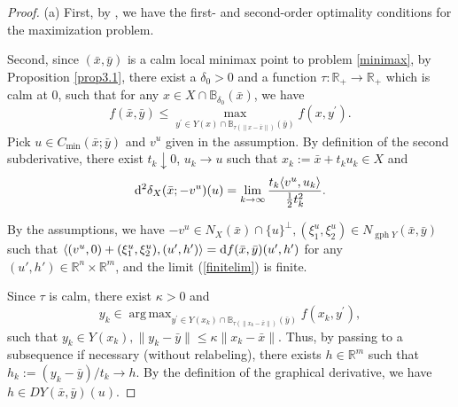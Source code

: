 \documentclass[11pt]{article}
\DeclareMathOperator*{\argmax}{arg\,max}
\numberwithin{equation}{section}
\begin{document}
{\begin{proof}
(a) First, by \cite[Proposition 2.9 (i)]{Ma2023}, we have the first- and second-order optimality conditions for the maximization problem.

Second, since $(\bar x,\bar y)$ is a calm local minimax point to problem \eqref{minimax}, by Proposition \ref{prop3.1}, there exist a $\delta_0 >0$ and a function $\tau: \mathbb{R}_{+} \rightarrow \mathbb{R}_{+}$ which is calm at $0$, such that for any $x \in X\cap \mathbb{B}_{\delta_0} (\bar x)$, we have
\begin{equation}
 f(\bar{x}, \bar{y}) \leq \max _{y^{\prime}  \in  Y(x)\cap \mathbb{B}_{\tau(\|x-\bar x\|)}(\bar y)} f\left(x, y^{\prime}\right) .\label{eqn4.211}
\end{equation}
Pick  $u\in C_{\min}(\bar x; \bar y)$ and $v^u$ given in the assumption.  By definition of the second subderivative, there exist $t_k\downarrow 0$, $u_k\to u$ such that $x_k:=\bar x+t_ku_k \in X$ and
\begin{equation}\label{finitelim}
{\rm d}^2 \delta_X(\bar x;-v^u)(u) = \lim\limits_{k\to \infty}\frac{t_k \langle v^u,u_k \rangle}{\frac{1}{2}t_k^2}.\end{equation}

 By the assumptions, we have $-v^u\in N_X(\bar x)\cap \{u\}^\perp, (\xi_1^u,\xi_2^u) \in N_{\operatorname{gph}Y}(\bar x,\bar y)$ such that   $\langle (v^u,0)+(\xi_1^u,\xi_2^u), (u',h') \rangle = {\rm d} f(\bar x,\bar y)(u',h')$ for any $(u',h') \in \mathbb{R}^n \times \mathbb{R}^m$, and   the  limit (\ref{finitelim})  is finite.

Since $\tau $ is calm,  there exist $\kappa>0$ and
\begin{equation*}
y_k \in \argmax _{y^{\prime}  \in  Y(x_k)\cap \mathbb{B}_{\tau(\|x_k-\bar x\|)}(\bar y)} f\left(x_k, y^{\prime}\right),
\end{equation*}
 such that $y_k \in Y(x_k), \|y_k-\bar y\| \leq \kappa \|x_k-\bar x\|$. Thus, by passing to a subsequence if necessary (without relabeling), there exists $h\in \mathbb{R}^m$ such that $h_k:=(y_k-\bar y)/t_k \to h$. By the definition of the graphical derivative, we have $h\in D Y(\bar x,\bar y)(u)$. 


\end{proof}}
\end{document}
